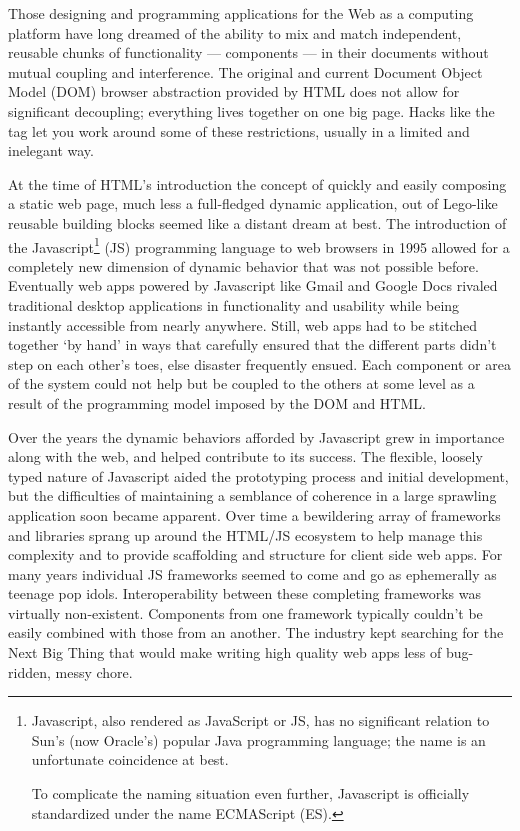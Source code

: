 Those designing and programming applications for the Web as a computing platform have long dreamed of the ability to mix and match independent, reusable chunks of functionality --- components --- in their documents without mutual coupling and interference. 
The original and current Document Object Model (DOM)
browser abstraction provided by HTML does not allow for significant decoupling; 
everything lives together on one big page. Hacks like the 
tag let you work around some of these restrictions, usually in a limited and inelegant way.

At the time of HTML's introduction the concept of quickly and easily composing a static web page, 
much less a full-fledged dynamic application, 
out of Lego-like reusable building blocks seemed like a distant dream at best. 
The introduction of the 
Javascript\footnote{Javascript, also rendered as JavaScript or JS, 
has no significant relation to Sun's (now Oracle's) popular Java programming language;
the name is an unfortunate coincidence at best.

To complicate the naming situation even further, Javascript is officially standardized under the name ECMAScript (ES).}
(JS) programming language to web browsers in 1995 allowed for a completely new dimension of dynamic behavior that was not possible before.
Eventually web apps powered by Javascript like Gmail and Google Docs rivaled traditional desktop applications in functionality and usability while being instantly accessible from nearly anywhere.
Still, web apps had to be stitched together `by hand' in ways that carefully ensured that the different parts didn't step on each other's toes, else disaster frequently ensued. 
Each component or area of the system could not help but be coupled to the others at some level as a result of the programming model imposed by the DOM and HTML.

Over the years the dynamic behaviors afforded by Javascript grew in importance along with the web, and helped contribute to its success. 
The flexible, loosely typed nature of Javascript aided the prototyping process and initial development,
but the difficulties of maintaining a semblance of coherence in a large sprawling application soon became apparent.
Over time a bewildering array of frameworks and libraries sprang up around the HTML/JS ecosystem to help manage this complexity and to provide scaffolding and structure for client side web apps.
For many years individual JS frameworks seemed to come and go as ephemerally as teenage pop idols. 
Interoperability between these completing frameworks was virtually non-existent. 
Components from one framework typically couldn't be easily combined with those from an another.
The industry kept searching for the Next Big Thing that would make writing high quality web apps less of bug-ridden, messy chore. 


